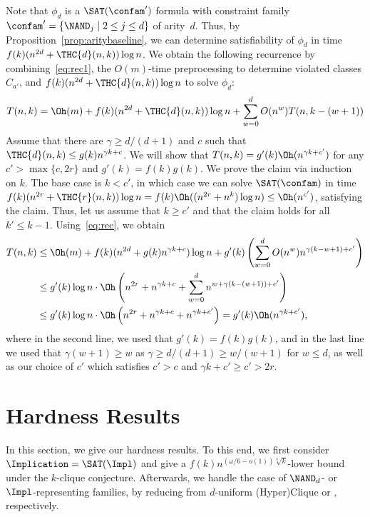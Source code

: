 %
  Note that $\phi_d$ is a $\SAT(\confam')$ formula with constraint family $\confam' = \{ \NAND_j \mid 2 \le j \le d\}$ of arity~$d$. Thus, by Proposition~\ref{prop:aritybaseline}, we can determine satisfiability of $\phi_d$ in time $f(k) (n^{2d} + \THC{d}(n, k))\log n$. We obtain the following recurrence by combining~\eqref{eq:rec1}, the $O(m)$-time preprocessing to determine violated classes $C_{a'}$, and $f(k)(n^{2d} + \THC{d}(n,k))\log n$ to solve $\phi_d$:  
  \begin{equation}\label{eq:rec}
  T(n,k) =  \Oh(m) + f(k)(n^{2d} + \THC{d}(n,k))\log n + \sum_{w=0}^d O(n^w) T(n, k-(w+1))
  \end{equation}
%
  Assume that there are $\gamma \ge d/(d+1)$ and $c$ such that $\THC{d}(n,k) \le g(k)n^{\gamma k+c}$. We will show that  $T(n,k) = g'(k)\Oh(n^{\gamma k + c'})$ for any $c'>\max\{c, 2r\}$ and $g'(k) = f(k)g(k)$. 
%
  We prove the claim via induction on $k$. The base case is $k < c'$, in which case we can solve $\SAT(\confam)$ in time $f(k)(n^{2r} + \THC{r}(n,k))\log n = f(k)\Oh((n^{2r}+n^k)\log n) \le \Oh(n^{c'})$, satisfying the claim. Thus, let us assume that $k \ge c'$ and that the claim holds for all $k'\le k-1$. Using~\eqref{eq:rec}, we obtain
\begin{align*}
T(n,k) & \le \Oh(m) + f(k)(n^{2d} + g(k) n^{\gamma k + c})\log n + g'(k) \left(\sum_{w=0}^d O(n^w) n^{\gamma (k-w+1) + c'}\right) \\
    & \le g'(k) \log n\cdot \Oh\left(n^{2r} + n^{\gamma k + c} + \sum_{w=0}^d n^{w + \gamma(k-(w+1)) + c'}\right) \\
    & \le g'(k) \log n\cdot \Oh\left(n^{2r} + n^{\gamma k + c} + n^{\gamma k + c'}\right) = g'(k) \Oh(n^{\gamma k + c'}),
\end{align*}
where in the second line, we used that $g'(k) = f(k)g(k)$, and in the last line we used that $\gamma(w+1) \ge w$ as $\gamma \ge d/(d+1) \ge w/(w+1)$ for $w\le d$, as well as our choice of $c'$ which satisfies $c' > c$ and $\gamma k + c' \ge c' > 2r$.
%
%
\section{Hardness Results}
\label{sec:hardness}
%
In this section, we give our hardness results. To this end, we first consider $\Implication = \SAT(\Impl)$ and give a $f(k)n^{(\omega/6-o(1))\sqrt[3]{k}}$-lower bound under the $k$-clique conjecture. Afterwards, we handle the case of $\NAND_{d}$- or $\Impl$-representing families, by reducing from $d$-uniform (Hyper)Clique or \Implication, respectively.
%

